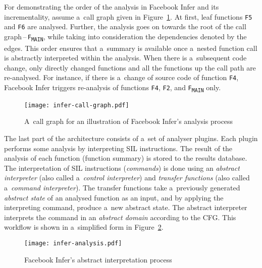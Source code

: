 \begin{example}
    \label{ex:fbinferAnalysis}
    For demonstrating the order of the analysis in Facebook Infer and its
    incrementality, assume a~call graph given in
    Figure~\ref{fig:inferCallGraph}. At first, leaf functions \texttt{F5} and
    \texttt{F6} are analysed. Further, the analysis goes on towards the root of
    the call graph\,--\,\texttt{F\textsubscript{MAIN}}, while taking into
    consideration the dependencies denoted by the edges. This order ensures
    that a~summary is available once a~nested function call is abstractly
    interpreted within the analysis. When there is a~subsequent code change,
    only directly changed functions and all the functions up the call path are
    re-analysed. For instance, if there is a~change of source code of function
    \texttt{F4}, Facebook Infer triggers re-analysis of functions \texttt{F4},
    \texttt{F2}, and \texttt{F\textsubscript{MAIN}} only.
\end{example}

\begin{figure}[hbt]
    \centering
    \texttt{[image: infer-call-graph.pdf]}
    \caption{%
        A~call graph for an illustration of Facebook Infer's analysis
        process~\cite{harmimBP, excel2019FBInfer, projectPracticeMarcin2018}%
    }
    \label{fig:inferCallGraph}
\end{figure}

The last part of the architecture consists of a~set of analyser plugins. Each
plugin performs some analysis by interpreting SIL instructions. The result
of the analysis of each function (function summary) is stored to the results
database. The interpretation of SIL instructions (\emph{commands}) is done using
an \emph{abstract interpreter} (also called a~\emph{control interpreter}) and
\emph{transfer functions} (also called a~\emph{command interpreter}). The
transfer functions take a~previously generated \emph{abstract state} of an
analysed function as an input, and by applying the interpreting command,
produce a~new abstract state. The abstract interpreter interprets the command
in an \emph{abstract domain} according to the CFG. This workflow is shown in
a~simplified form in Figure~\ref{fig:inferAnalysis}.

\begin{figure}[hbt]
    \centering
    \texttt{[image: infer-analysis.pdf]}
    \caption{%
        Facebook Infer's abstract interpretation
        process~\cite{harmimBP, projectPracticeMarcin2018}%
    }
    \label{fig:inferAnalysis}
\end{figure}

